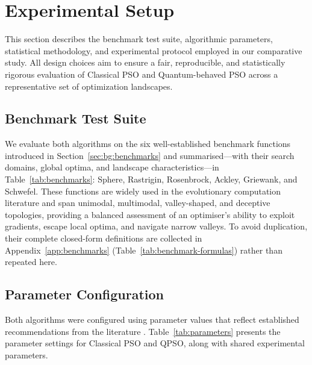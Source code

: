 \section{Experimental Setup}
\label{sec:experimental-setup}

This section describes the benchmark test suite, algorithmic parameters, statistical methodology, and experimental protocol employed in our comparative study. All design choices aim to ensure a fair, reproducible, and statistically rigorous evaluation of Classical PSO and Quantum-behaved PSO across a representative set of optimization landscapes.

\subsection{Benchmark Test Suite}
\label{subsec:benchmarks}

We evaluate both algorithms on the six well-established benchmark functions
introduced in Section~\ref{sec:bg:benchmarks} and summarised---with their
search domains, global optima, and landscape characteristics---in
Table~\ref{tab:benchmarks}: Sphere, Rastrigin, Rosenbrock, Ackley, Griewank,
and Schwefel. These functions are widely used in the evolutionary computation
literature and span unimodal, multimodal, valley-shaped, and deceptive
topologies, providing a balanced assessment of an optimiser's ability to
exploit gradients, escape local optima, and navigate narrow valleys. To avoid
duplication, their complete closed-form definitions are collected in
Appendix~\ref{app:benchmarks} (Table~\ref{tab:benchmark-formulas}) rather than
repeated here.

\subsection{Parameter Configuration}
\label{subsec:parameters}

Both algorithms were configured using parameter values that reflect established recommendations from the literature \cite{Clerc2002,Sun2004}. Table~\ref{tab:parameters} presents the parameter settings for Classical PSO and QPSO, along with shared experimental parameters.

